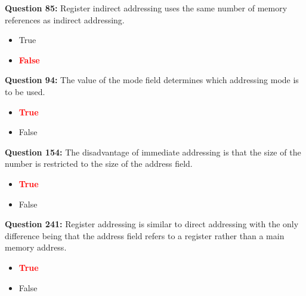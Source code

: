 \documentclass[12pt,a4paper]{article}
\begin{document}
\textbf{Question 85:} Register indirect addressing uses the same number of memory references as indirect addressing.

\begin{itemize}
    \item[\textbf{A.}] True
    \item[\textbf{B.}] \textcolor{red}{\textbf{False}}
\end{itemize}

\vspace{0.5cm}

\vspace{0.5cm}

\textbf{Question 94:} The value of the mode field determines which addressing mode is to be used.

\begin{itemize}
    \item[\textbf{A.}] \textcolor{red}{\textbf{True}}
    \item[\textbf{B.}] False
\end{itemize}

\vspace{0.5cm}

\vspace{0.5cm}

\textbf{Question 154:} The disadvantage of immediate addressing is that the size of the number is restricted to the size of the address field.

\begin{itemize}
    \item[\textbf{A.}] \textcolor{red}{\textbf{True}}
    \item[\textbf{B.}] False
\end{itemize}

\vspace{0.5cm}

\vspace{0.5cm}

\textbf{Question 241:} Register addressing is similar to direct addressing with the only difference being that the address field refers to a register rather than a main memory address.

\begin{itemize}
    \item[\textbf{A.}] \textcolor{red}{\textbf{True}}
    \item[\textbf{B.}] False
\end{itemize}

\vspace{0.5cm}
\end{document}
